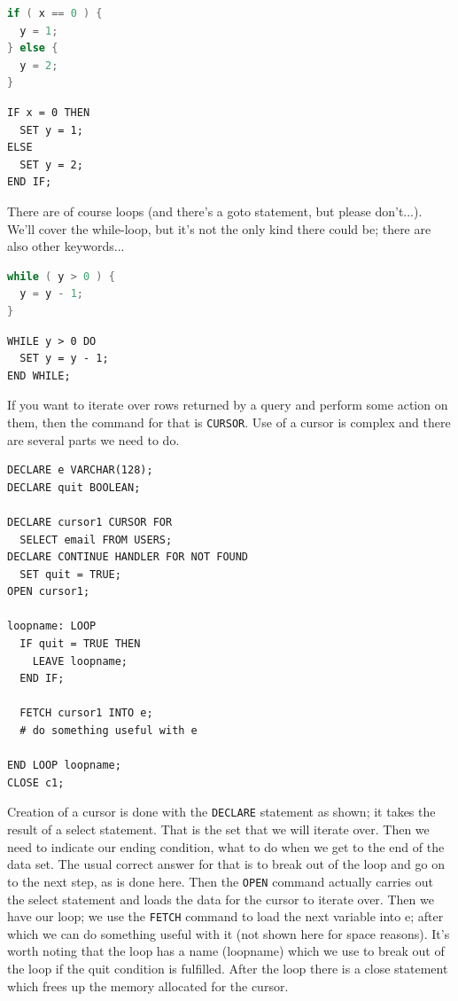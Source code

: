 \begin{multicols}{2}
\begin{lstlisting}[language=C]
if ( x == 0 ) {
  y = 1;
} else {
  y = 2;
}
\end{lstlisting}
\columnbreak
\begin{verbatim}
IF x = 0 THEN
  SET y = 1;
ELSE
  SET y = 2;
END IF;
\end{verbatim}
\end{multicols}

There are of course loops (and there's a goto statement, but please don't...). We'll cover the while-loop, but it's not the only kind there could be; there are also other keywords...

\begin{multicols}{2}
\begin{lstlisting}[language=C]
while ( y > 0 ) {
  y = y - 1;
} 
\end{lstlisting}
\columnbreak
\begin{verbatim}
WHILE y > 0 DO
  SET y = y - 1;
END WHILE;
\end{verbatim}
\end{multicols}

If you want to iterate over rows returned by a query and perform some action on them, then the command for that is \texttt{CURSOR}. Use of a cursor is complex and there are several parts we need to do.

{\small
\begin{verbatim}
DECLARE e VARCHAR(128);
DECLARE quit BOOLEAN;

DECLARE cursor1 CURSOR FOR 
  SELECT email FROM USERS;
DECLARE CONTINUE HANDLER FOR NOT FOUND
  SET quit = TRUE;  
OPEN cursor1;

loopname: LOOP
  IF quit = TRUE THEN
    LEAVE loopname;
  END IF;

  FETCH cursor1 INTO e;
  # do something useful with e

END LOOP loopname;
CLOSE c1;
\end{verbatim}
}

Creation of a cursor is done with the \texttt{DECLARE} statement as shown; it takes the result of a select statement. That is the set that we will iterate over. Then we need to indicate our ending condition, what to do when we get to the end of the data set. The usual correct answer for that is to break out of the loop and go on to the next step, as is done here. Then the \texttt{OPEN} command actually carries out the select statement and loads the data for the cursor to iterate over. Then we have our loop; we use the \texttt{FETCH} command to load the next variable into e; after which we can do something useful with it (not shown here for space reasons). It's worth noting that the loop has a name (loopname) which we use to break out of the loop if the quit condition is fulfilled. After the loop there is a close statement which frees up the memory allocated for the cursor.

